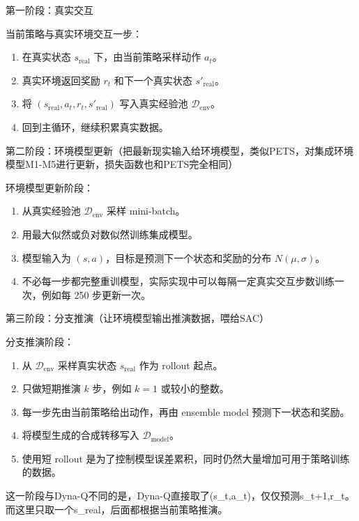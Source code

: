 第一阶段：真实交互

当前策略与真实环境交互一步：

\begin{enumerate}
\def\labelenumi{\arabic{enumi}.}
\tightlist
\item
  在真实状态 \(s_{\mathrm{real}}\) 下，由当前策略采样动作 \(a_t\)。
\item
  真实环境返回奖励 \(r_t\) 和下一个真实状态 \(s'_{\mathrm{real}}\)。
\item
  将 \((s_{\mathrm{real}},a_t,r_t,s'_{\mathrm{real}})\) 写入真实经验池 \(\mathcal D_{\mathrm{env}}\)。
\item
  回到主循环，继续积累真实数据。
\end{enumerate}

第二阶段：环境模型更新（把最新现实输入给环境模型，类似PETS，对集成环境模型M1-M5进行更新，损失函数也和PETS完全相同）

环境模型更新阶段：

\begin{enumerate}
\def\labelenumi{\arabic{enumi}.}
\tightlist
\item
  从真实经验池 \(\mathcal D_{\mathrm{env}}\) 采样 mini-batch。
\item
  用最大似然或负对数似然训练集成模型。
\item
  模型输入为 \((s,a)\)，目标是预测下一个状态和奖励的分布 \(N(\mu,\sigma)\)。
\item
  不必每一步都完整重训模型，实际实现中可以每隔一定真实交互步数训练一次，例如每 250 步更新一次。
\end{enumerate}

第三阶段：分支推演（让环境模型输出推演数据，喂给SAC）

分支推演阶段：

\begin{enumerate}
\def\labelenumi{\arabic{enumi}.}
\tightlist
\item
  从 \(\mathcal D_{\mathrm{env}}\) 采样真实状态 \(s_{\mathrm{real}}\) 作为 rollout 起点。
\item
  只做短期推演 \(k\) 步，例如 \(k=1\) 或较小的整数。
\item
  每一步先由当前策略给出动作，再由 ensemble model 预测下一状态和奖励。
\item
  将模型生成的合成转移写入 \(\mathcal D_{\mathrm{model}}\)。
\item
  使用短 rollout 是为了控制模型误差累积，同时仍然大量增加可用于策略训练的数据。
\end{enumerate}

这一阶段与Dyna-Q不同的是，Dyna-Q直接取了(s\_t,a\_t)，仅仅预测s\_t+1,r\_t。而这里只取一个s\_real，后面都根据当前策略推演。

